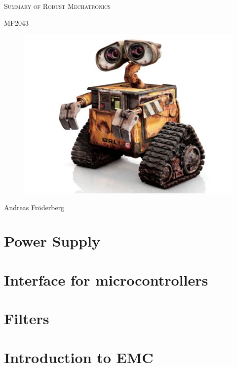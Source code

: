 \documentclass[10pt,a4paper]{article}
\begin{document}
\begin{titlepage}
    \centering
    {\scshape\LARGE Summary of Robust Mechatronics \par}
    {\scshape MF2043 \par}
    \vspace{2cm}
    \begin{figure}[H]
        \includegraphics[scale=0.7]{./figures/wall-e.jpg}
    \end{figure}
    \vspace{3cm}
    Andreas Fröderberg
\end{titlepage}
\section{Power Supply}

\clearpage
\section{Interface for microcontrollers}

\clearpage
\section{Filters}

\clearpage
\section{Introduction to EMC}

\end{document}
